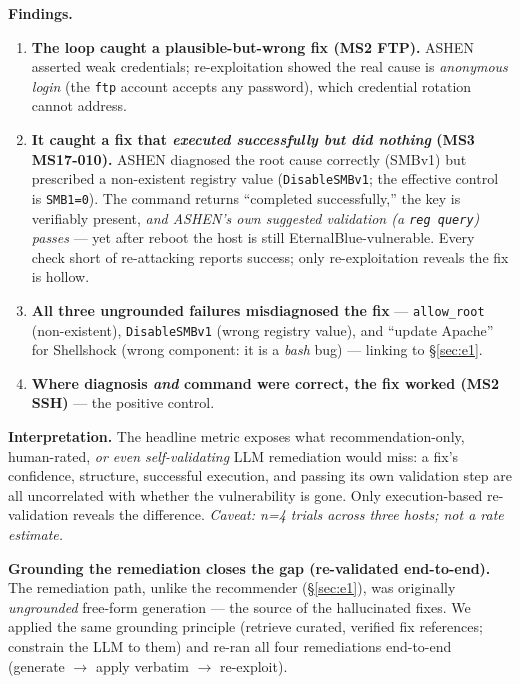 \documentclass[conference]{IEEEtran}
\newcommand{\code}[1]{\texttt{#1}}
\begin{document}
\noindent\textbf{Findings.}
\begin{enumerate}
\item \textbf{The loop caught a plausible-but-wrong fix (MS2 FTP).} ASHEN asserted
weak credentials; re-exploitation showed the real cause is \emph{anonymous login}
(the \code{ftp} account accepts any password), which credential rotation cannot
address.
\item \textbf{It caught a fix that \emph{executed successfully but did nothing}
(MS3 MS17-010).} ASHEN diagnosed the root cause correctly (SMBv1) but prescribed a
non-existent registry value (\code{DisableSMBv1}; the effective control is
\code{SMB1=0}). The command returns ``completed successfully,'' the key is
verifiably present, \emph{and ASHEN's own suggested validation (a \code{reg query})
passes} --- yet after reboot the host is still EternalBlue-vulnerable. Every check
short of re-attacking reports success; only re-exploitation reveals the fix is
hollow.
\item \textbf{All three ungrounded failures misdiagnosed the fix} ---
\code{allow\_root} (non-existent), \code{DisableSMBv1} (wrong registry value),
and ``update Apache'' for Shellshock (wrong component: it is a \emph{bash} bug) ---
linking to \S\ref{sec:e1}.
\item \textbf{Where diagnosis \emph{and} command were correct, the fix worked
(MS2 SSH)} --- the positive control.
\end{enumerate}

\noindent\textbf{Interpretation.} The headline metric exposes what
recommendation-only, human-rated, \emph{or even self-validating} LLM remediation
would miss: a fix's confidence, structure, successful execution, and passing its
own validation step are all uncorrelated with whether the vulnerability is gone.
Only execution-based re-validation reveals the difference.
\emph{Caveat: n=4 trials across three hosts; not a rate estimate.}

\noindent\textbf{Grounding the remediation closes the gap (re-validated
end-to-end).} The remediation path, unlike the recommender (\S\ref{sec:e1}), was
originally \emph{ungrounded} free-form generation --- the source of the
hallucinated fixes. We applied the same grounding principle (retrieve curated,
verified fix references; constrain the LLM to them) and re-ran all four
remediations end-to-end (generate $\rightarrow$ apply verbatim $\rightarrow$
re-exploit).
\end{document}
